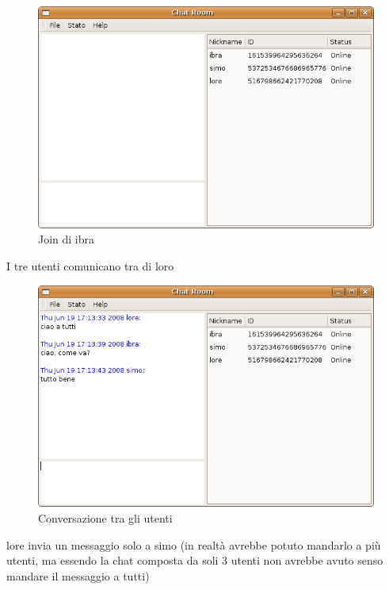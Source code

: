 \begin{figure}[H]
\begin{center}
\includegraphics[scale=0.5]{etc/join2.png}
\caption{Join di ibra}
\label{join2}
\end{center}
\end{figure}
I tre utenti comunicano tra di loro
\begin{figure}[H]
\begin{center}
\includegraphics[scale=0.5]{etc/conversazione_chat.png}
\caption{Conversazione tra gli utenti}
\label{conversazione\_chat}
\end{center}
\end{figure}
lore invia un messaggio solo a simo (in realtà avrebbe potuto mandarlo a più utenti, ma essendo la chat composta da soli 3 utenti non avrebbe avuto senso mandare il messaggio a tutti)
